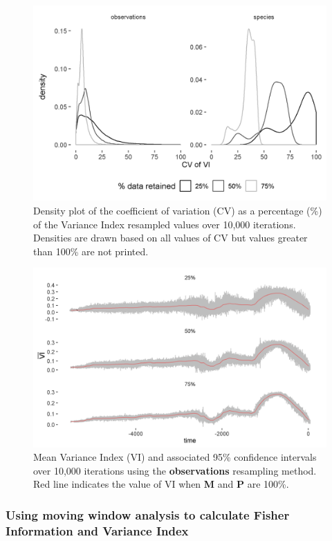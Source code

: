 \documentclass[print]{nuthesis}
\begin{document}
\begin{figure}
\includegraphics[width=0.85\linewidth]{./chapterFiles/resampling/figsCalledInDiss/VI_cvDensity} \caption{Density plot of the coefficient of variation (CV) as a percentage (\%) of the Variance Index resampled values over 10,000 iterations. Densities are drawn based on all values of CV but values greater than 100\% are not printed.}\label{fig:viCV}
\end{figure}

\begin{figure}
\includegraphics[width=0.85\linewidth]{./chapterFiles/resampling/figsCalledInDiss/VI_observations_ribboned_facetByProb} \caption{Mean Variance Index (VI) and associated 95\% confidence intervals over 10,000 iterations using the \textbf{observations} resampling method. Red line indicates the value of VI when \textbf{M} and \textbf{P} are 100\%.}\label{fig:viResamp}
\end{figure}
\hypertarget{using-moving-window-analysis-to-calculate-fisher-information-and-variance-index}{%
\subsubsection{Using moving window analysis to calculate Fisher Information and Variance Index}\label{using-moving-window-analysis-to-calculate-fisher-information-and-variance-index}}
\end{document}
